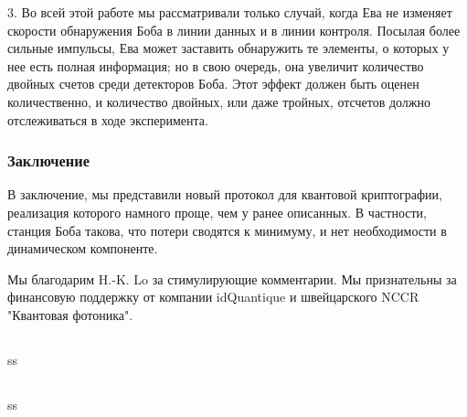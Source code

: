 3. Во всей этой работе мы рассматривали только случай, когда Ева не изменяет скорости обнаружения Боба в линии данных и в линии контроля. Посылая более сильные импульсы, Ева может заставить обнаружить те элементы, о которых у нее есть полная информация; но в свою очередь, она увеличит количество двойных счетов среди детекторов Боба. Этот эффект должен быть оценен количественно, и количество двойных, или даже тройных, отсчетов должно отслеживаться в ходе эксперимента.

\subsubsection{Заключение}

В заключение, мы представили новый протокол для квантовой криптографии, реализация которого намного проще, чем у ранее описанных. В частности, станция Боба такова, что потери сводятся к минимуму, и нет необходимости в динамическом компоненте.

Мы благодарим H.-K. Lo за стимулирующие комментарии. Мы признательны за финансовую поддержку от компании idQuantique и швейцарского NCCR "Квантовая фотоника".

\subsection{\review}
ss
\subsection{\dic}
ss